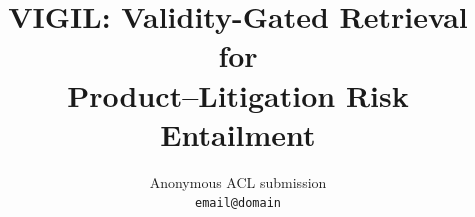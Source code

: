 
\title{VIGIL: Validity-Gated Retrieval for\\Product--Litigation Risk Entailment}

\author{
  Anonymous ACL submission \\
  \texttt{email@domain} \\
}
